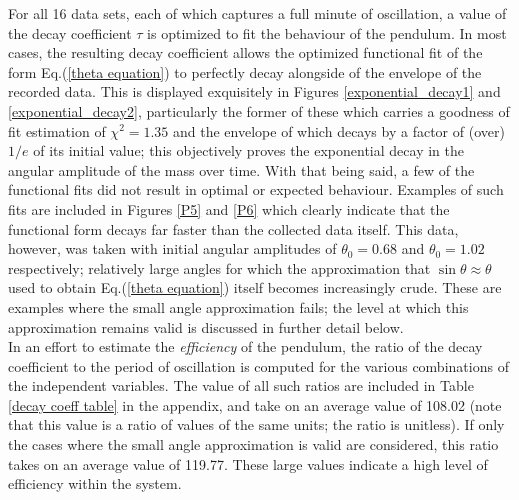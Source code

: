 For all 16 data sets, each of which captures a full minute of oscillation, a value of the decay coefficient $\tau$ is optimized to fit the behaviour of the pendulum. In most cases, the resulting decay coefficient allows the optimized functional fit of the form Eq.(\ref{theta equation}) to perfectly decay alongside of the envelope of the recorded data. This is displayed exquisitely in Figures \ref{exponential_decay1} and \ref{exponential_decay2}, particularly the former of these which carries a goodness of fit estimation of $\chi^2 = 1.35$ and the envelope of which decays by a factor of (over) $1/e$ of its initial value; this objectively proves the exponential decay in the angular amplitude of the mass over time.  With that being said, a few of the functional fits did not result in optimal or expected behaviour. Examples of such fits are included in Figures \ref{P5} and \ref{P6} which clearly indicate that the functional form decays far faster than the collected data itself. This data, however, was taken with initial angular amplitudes of $\theta_0 = 0.68$ and $\theta_0 = 1.02$ respectively; relatively large angles for which the approximation that $\sin\theta\approx \theta$ used to obtain Eq.(\ref{theta equation}) itself becomes increasingly crude. These are examples where the small angle approximation fails; the level at which this approximation remains valid is discussed in further detail below.\\[0.10cm]

In an effort to estimate the \emph{efficiency} of the pendulum, the ratio of the decay coefficient to the period of oscillation is computed for the various combinations of the independent variables. The value of all such ratios are included in Table \ref{decay coeff table} in the appendix, and take on an average value of 108.02 (note that this value is a ratio of values of the same units; the ratio is unitless). If only the cases where the small angle approximation is valid are considered, this ratio takes on an average value of 119.77. These large values indicate a high level of efficiency within the system. \\[0.10cm]

